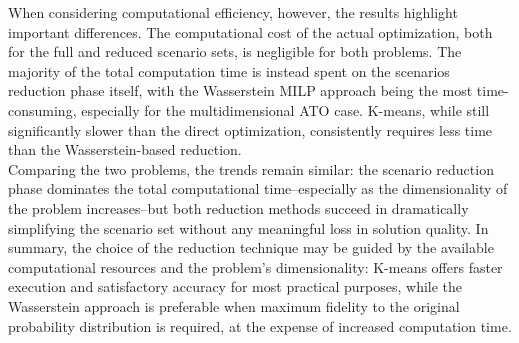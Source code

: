 \documentclass[a4paper,12pt]{article}
\begin{document}
	When considering computational efficiency, however, the results highlight important differences. The computational cost of the actual optimization, both for the full and reduced scenario sets, is negligible for both problems. The majority of the total computation time is instead spent on the scenarios reduction phase itself, with the Wasserstein MILP approach being the most time-consuming, especially for the multidimensional ATO case. K-means, while still significantly slower than the direct optimization, consistently requires less time than the Wasserstein-based reduction.\\
	
	\noindent Comparing the two problems, the trends remain similar: the scenario reduction phase dominates the total computational time--especially as the dimensionality of the problem increases--but both reduction methods succeed in dramatically simplifying the scenario set without any meaningful loss in solution quality. In summary, the choice of the reduction technique may be guided by the available computational resources and the problem's dimensionality: K-means offers faster execution and satisfactory accuracy for most practical purposes, while the Wasserstein approach is preferable when maximum fidelity to the original probability distribution is required, at the expense of increased computation time.
	
	
	
	
\end{document}
